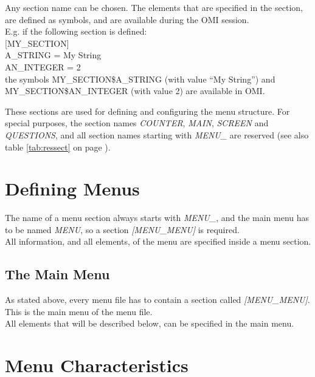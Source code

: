 \documentclass[a4paper]{book}
\newcommand{\vs}{\vspace{3mm}}
\renewcommand{\indent}{\hspace*{5mm}}
\begin{document}
\vs

Any section name can be chosen. The elements that are specified in the 
section, are defined as symbols, and are available during the OMI session. \\
E.g. if the following section is defined: \\
\indent\textsf{[MY{\_}SECTION]} \\
\indent\indent\textsf{A{\_}STRING = My String} \\
\indent\indent\textsf{AN{\_}INTEGER = 2} \\
the symbols MY{\_}SECTION{\$}A{\_}STRING (with value ``My String'') and 
\linebreak MY{\_}SECTION{\$}AN{\_}INTEGER (with value 2) are available in OMI.

\vs

These sections are used for defining and configuring the menu structure. For 
special purposes, the section names \textsl{COUNTER}, \textsl{MAIN}, \textsl{SCREEN} and 
\textsl{QUESTIONS}, and all section names starting with \textsl{MENU{\_}} are reserved 
(see also table \ref{tab:ressect} on page \pageref{tab:ressect}).

\section{Defining Menus}
\label{subsec:defining}

The name of a menu section always starts with \textsl{MENU{\_}}, and the main menu 
has to be named \textsl{MENU}, so a section \textsl{[MENU{\_}MENU]} is required. \\
All information, and all elements, of the menu are specified inside a menu 
section.

\subsection{The Main Menu}
\label{subsubsec:mylabel21}

As stated above, every menu file has to contain a section called 
\textsl{[MENU{\_}MENU]}. This is the main menu of the menu file. \\
All elements that will be described below, can be specified in the main 
menu.

\section{Menu Characteristics}
\label{subsec:mylabel3}
\end{document}
